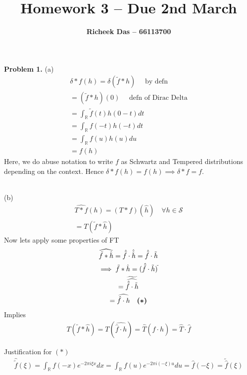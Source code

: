 \documentclass{article}
\title{Homework 3 --  Due 2nd March}
\author{\textbf{Richeek Das -- 66113700}}
\newcommand{\R}{\mathbb{R}}
\newcommand{\Sc}{\mathcal{S}}
\begin{document}
\maketitle

\textbf{Problem 1. } (a)
\begin{gather*}
    \delta * f(h) = \delta(\tilde{f} * h) \quad \text{ by defn}\\
    = (\tilde{f}*h)(0) \quad \text{ defn of Dirac Delta}\\
    = \int_{\R} \tilde{f}(t) h(0-t) dt\\
    = \int_{\R} f(-t) h(-t) dt \\
    = \int_{\R} f(u)h(u)du \\
    = f(h)
\end{gather*}
Here, we do abuse notation to write $f$ as Schwartz and Tempered distributions depending on the context. Hence $\delta * f(h) = f(h) \implies \delta * f = f$.
\\~

(b) 
\begin{gather*}
    \widehat{T * f}(h) = (T*f)(\hat{h}) \quad \forall h \in \Sc\\
    = T(\tilde{f} * \hat{h})
\end{gather*}
Now lets apply some properties of FT
\begin{gather*}
    \widehat{\tilde{f} * \hat{h}} = \hat{\tilde{f}} \cdot \hat{\hat{h}} = \hat{\tilde{f}} \cdot \tilde{h}\\
    \implies \tilde{f} * \hat{h} = (\hat{\tilde{f}} \cdot \tilde{h})^{\Breve{}}\\
    = \widetilde{\widehat{\hat{\tilde{f}} \cdot \tilde{h}}} \\
    = \widehat{\hat{f}\cdot h} \quad \boldsymbol{(*)}
\end{gather*}
Implies
\begin{gather*}
    T(\tilde{f} * \hat{h}) = T(\widehat{\hat{f}\cdot h}) = \hat{T}(\hat{f}\cdot h) = \hat{T}\cdot \hat{f}
\end{gather*}

Justification for $\boldsymbol{(*)}$
\begin{gather*}
    \hat{\tilde{f}}(\xi) = \int_{\R} f(-x) e^{- 2\pi i \xi x} dx = \int_{\R} f(u)e^{- 2\pi i (-\xi) u} du = \hat{f}(-\xi) = \tilde{\hat{f}}(\xi)
\end{gather*}
\\~
\end{document}
